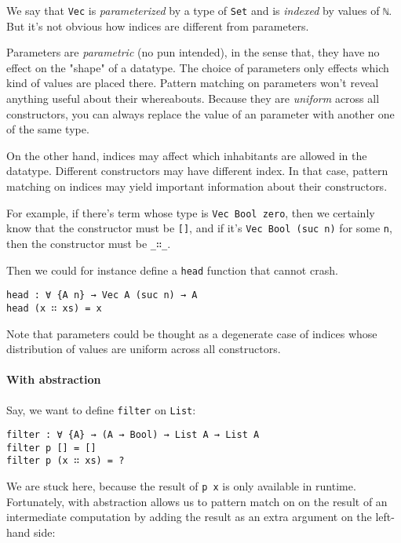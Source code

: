 \documentclass[14pt, a4paper]{article}
\begin{document}
We say that {\lstinline|Vec|} is \textit{parameterized} by a type of {\lstinline|Set|}
and is \textit{indexed} by values of {\lstinline|ℕ|}. But it's not obvious how indices are
different from parameters.

Parameters are \textit{parametric} (no pun intended), in the sense that, they
have no effect on the "shape" of a datatype. The choice of parameters only effects
which kind of values are placed there. Pattern matching on parameters won't reveal
anything useful about their whereabouts. Because they are \textit{uniform} across
all constructors, you can always replace the value of an parameter with another one
of the same type.

On the other hand, indices may affect which inhabitants are allowed in the
datatype. Different constructors may have different index. In that case, pattern
matching on indices may yield important information about their constructors.

For example, if there's term whose type is {\lstinline|Vec Bool zero|}, then
we certainly know that the constructor must be {\lstinline|[]|}, and if it's
{\lstinline|Vec Bool (suc n)|} for some {\lstinline|n|}, then the constructor
must be {\lstinline|_∷_|}.

Then we could for instance define a {\lstinline|head|} function that cannot crash.

\begin{lstlisting}
head : ∀ {A n} → Vec A (suc n) → A
head (x ∷ xs) = x
\end{lstlisting}

Note that parameters could be thought as a degenerate case of indices whose distribution
of values are uniform across all constructors.

\paragraph{With abstraction}

Say, we want to define {\lstinline|filter|} on {\lstinline|List|}:

\begin{lstlisting}
filter : ∀ {A} → (A → Bool) → List A → List A
filter p [] = []
filter p (x ∷ xs) = ?
\end{lstlisting}

We are stuck here, because the result of {\lstinline|p x|} is only available in
runtime. Fortunately, with abstraction allows us to pattern match on on the result
of an intermediate computation by adding the result as an extra argument on the
left-hand side:
\end{document}
